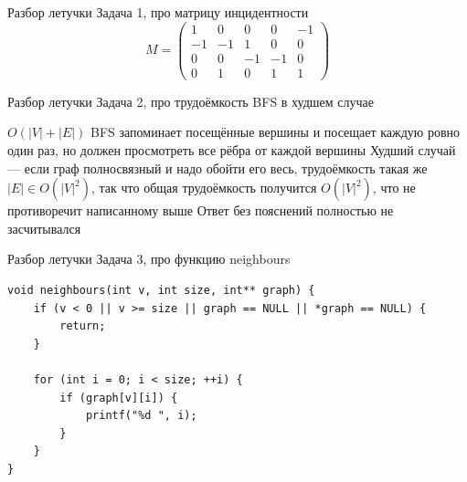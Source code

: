 \documentclass{../../slides-style}
\begin{document}
    
    \begin{frame}[plain]
        \titlepage
    \end{frame}

    \begin{frame}{Разбор летучки}
        Задача 1, про матрицу инцидентности
        $$
        M = \begin{pmatrix}
        1 & 0 & 0 & 0 & -1 \\
        -1 & -1 & 1 & 0 & 0 \\
        0 & 0 & -1 & -1 & 0 \\
        0 & 1 & 0 & 1 & 1
        \end{pmatrix}
        $$
        \begin{center}
        \end{center}
    \end{frame}

    \begin{frame}{Разбор летучки}
        Задача 2, про трудоёмкость BFS в худшем случае
        \begin{outline}
            \1 $O(|V| + |E|)$
            \1 BFS запоминает посещённые вершины и посещает каждую ровно один раз, но должен просмотреть все рёбра от каждой вершины
            \1 Худший случай --- если граф полносвязный и надо обойти его весь, трудоёмкость такая же
                \1 $|E| \in O(|V|^2)$, так что общая трудоёмкость получится $O(|V|^2)$, что не противоречит написанному выше
            \1 Ответ без пояснений полностью не засчитывался
        \end{outline}
    \end{frame}

    \begin{frame}[fragile]{Разбор летучки}
        Задача 3, про функцию neighbours
        \begin{verbatim}
void neighbours(int v, int size, int** graph) {
    if (v < 0 || v >= size || graph == NULL || *graph == NULL) {
        return;
    }

    for (int i = 0; i < size; ++i) {
        if (graph[v][i]) {
            printf("%d ", i);
        }
    }
}
        \end{verbatim}
    \end{frame}
\end{document}
